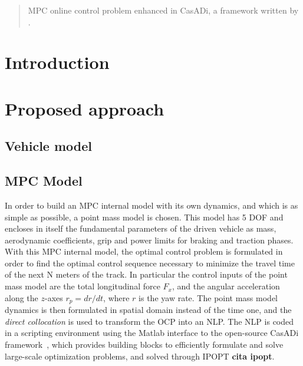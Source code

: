 \documentclass[conference]{IEEEtran} %
\begin{document}

\begin{abstract}
MPC online control problem enhanced in CasADi, a framework written by \citet{Andersson2019}.
\end{abstract}

\IEEEpeerreviewmaketitle

\section{Introduction}



\section{Proposed approach} %


\subsection{Vehicle model}

\subsection{MPC Model}
In order to build an MPC internal model with its own dynamics, and which is as simple as possible, a point mass model is chosen.
This model has 5 DOF and encloses in itself the fundamental parameters of the driven vehicle as mass, aerodynamic coefficients, grip and power limits for braking and traction phases.
With this MPC internal model, the optimal control problem is formulated in order to find the optimal control sequence necessary to minimize the travel time of the next N meters of the track. In particular the control inputs of the point mass model are the total longitudinal force $F_{x}$, and the angular acceleration along the $z$-axes $r_p = dr/dt$, where $r$ is the yaw rate.
The point mass model dynamics is then formulated in spatial domain instead of the time one, and the \textit{direct collocation} is used to transform the OCP into an NLP. The NLP is coded in a scripting environment using the Matlab interface to the open-source CasADi framework~\cite{Andersson2019}, which provides building
blocks to efficiently formulate and solve large-scale optimization problems, and solved through IPOPT \textbf{cita ipopt}.
\end{document}
